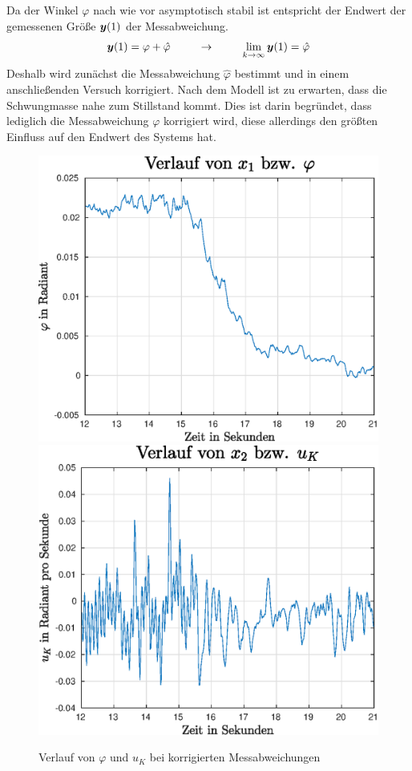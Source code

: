 Da der Winkel $\varphi$ nach wie vor asymptotisch stabil ist entspricht der Endwert der gemessenen Größe $\boldsymbol{y}(1)$ der Messabweichung.
\begin{equation}
\boldsymbol{y}(1) = \varphi + \hat{\varphi} \hspace{25pt} \rightarrow\hspace{25pt} \lim_{k\rightarrow\infty}\boldsymbol{y}(1) = \hat{\varphi}
\end{equation}
Deshalb wird zunächst die Messabweichung $\hat{\varphi}$ bestimmt und in einem anschließenden Versuch korrigiert. Nach dem Modell ist zu erwarten, dass die Schwungmasse nahe zum Stillstand kommt. Dies ist darin begründet, dass lediglich die Messabweichung $\varphi$ korrigiert wird, diese allerdings den größten Einfluss auf den Endwert des Systems hat.
\begin{figure}[h!]
\includegraphics[width=0.45\linewidth]{img/edge_exp2_phi.eps}
\includegraphics[width=0.45\linewidth]{img/edge_exp2_uk.eps}
\label{plot1_edge_exp2}
\caption{Verlauf von $\varphi$ und $u_K$ bei korrigierten Messabweichungen}
\end{figure}

